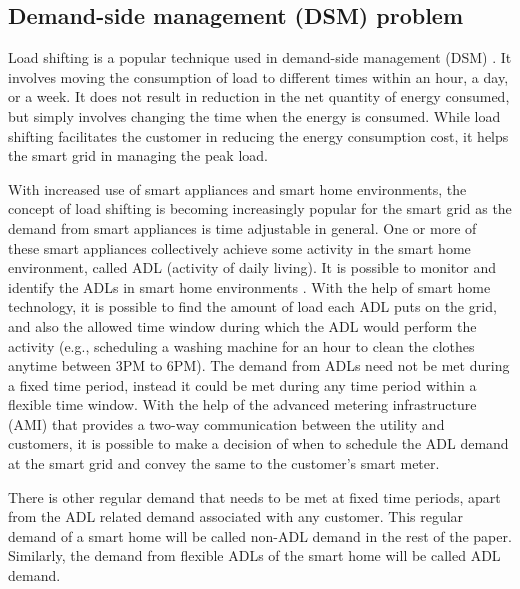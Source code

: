\subsection{Demand-side management (DSM) problem}
Load shifting is a popular technique used in demand-side management (DSM) \cite{DTU2010}. It involves moving the consumption of load to different times within an hour,  a day, or  a week. It does not result in reduction in the net quantity of energy consumed, but simply involves changing the time when the energy is consumed. While load shifting facilitates the customer in reducing the energy consumption cost, it helps the smart grid in managing the peak load.

With increased use of smart appliances and smart home environments, the concept of load shifting is becoming increasingly popular for the smart grid as the demand from smart appliances is time adjustable in general. One or more of these smart appliances collectively achieve some activity in the smart home environment, called ADL (activity of daily living). It is possible to monitor and identify the ADLs in smart home environments \cite{GPG2016}.%
  With the help of smart home technology, it is possible to find the amount of load each ADL puts on the grid, and also the allowed time window during which the ADL would perform the activity (e.g., scheduling a  washing machine for an hour to clean the clothes anytime between 3PM to 6PM). 
 The demand from  ADLs need not be met during a fixed time period, instead it could be met during any time period within a flexible time window. With the help of the advanced metering infrastructure (AMI) that provides a two-way communication between the utility and customers, it is possible to make a decision of when to schedule the ADL demand at the smart grid and convey the same to the customer's smart meter. 

There is other regular demand that needs to be met at fixed time periods, apart from the ADL related demand associated with any customer. This regular demand of a smart home will be called non-ADL demand in the rest of the paper. Similarly, the demand from flexible ADLs of the smart home will be called ADL demand.

